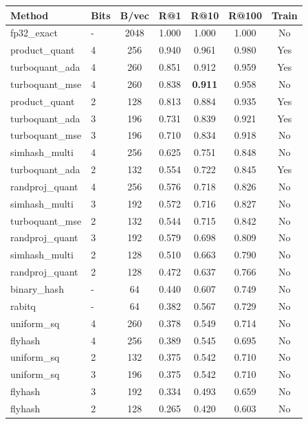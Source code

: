 \begin{tabular}{llccccc}
\toprule
Method & Bits & B/vec & R@1 & R@10 & R@100 & Train \\
\midrule
fp32\_exact & - & 2048 & 1.000 & 1.000 & 1.000 & No \\
product\_quant & 4 & 256 & 0.940 & 0.961 & 0.980 & Yes \\
turboquant\_ada & 4 & 260 & 0.851 & 0.912 & 0.959 & Yes \\
turboquant\_mse & 4 & 260 & 0.838 & \textbf{0.911} & 0.958 & No \\
product\_quant & 2 & 128 & 0.813 & 0.884 & 0.935 & Yes \\
turboquant\_ada & 3 & 196 & 0.731 & 0.839 & 0.921 & Yes \\
turboquant\_mse & 3 & 196 & 0.710 & 0.834 & 0.918 & No \\
simhash\_multi & 4 & 256 & 0.625 & 0.751 & 0.848 & No \\
turboquant\_ada & 2 & 132 & 0.554 & 0.722 & 0.845 & Yes \\
randproj\_quant & 4 & 256 & 0.576 & 0.718 & 0.826 & No \\
simhash\_multi & 3 & 192 & 0.572 & 0.716 & 0.827 & No \\
turboquant\_mse & 2 & 132 & 0.544 & 0.715 & 0.842 & No \\
randproj\_quant & 3 & 192 & 0.579 & 0.698 & 0.809 & No \\
simhash\_multi & 2 & 128 & 0.510 & 0.663 & 0.790 & No \\
randproj\_quant & 2 & 128 & 0.472 & 0.637 & 0.766 & No \\
binary\_hash & - & 64 & 0.440 & 0.607 & 0.749 & No \\
rabitq & - & 64 & 0.382 & 0.567 & 0.729 & No \\
uniform\_sq & 4 & 260 & 0.378 & 0.549 & 0.714 & No \\
flyhash & 4 & 256 & 0.389 & 0.545 & 0.695 & No \\
uniform\_sq & 2 & 132 & 0.375 & 0.542 & 0.710 & No \\
uniform\_sq & 3 & 196 & 0.375 & 0.542 & 0.710 & No \\
flyhash & 3 & 192 & 0.334 & 0.493 & 0.659 & No \\
flyhash & 2 & 128 & 0.265 & 0.420 & 0.603 & No \\
\bottomrule
\end{tabular}

